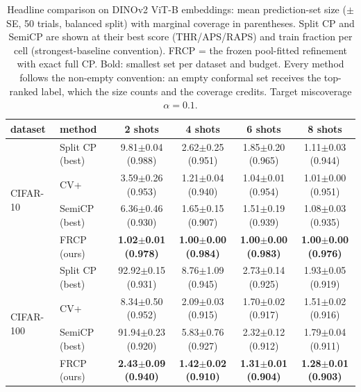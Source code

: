 \begin{table}[t]
\centering
\small
\caption{Headline comparison on DINOv2 ViT-B embeddings: mean prediction-set size ($\pm$ SE, 50 trials, balanced split) with marginal coverage in parentheses. Split CP and SemiCP are shown at their best score (THR/APS/RAPS) and train fraction per cell (strongest-baseline convention). FRCP = the frozen pool-fitted refinement with exact full CP. Bold: smallest set per dataset and budget. Every method follows the non-empty convention: an empty conformal set receives the top-ranked label, which the size counts and the coverage credits. Target miscoverage $\alpha=0.1$.}
\label{tab:headline-main}
\begin{tabular}{llcccc}
\toprule
dataset & method & 2 shots & 4 shots & 6 shots & 8 shots\\
\midrule
\multirow{4}{*}{CIFAR-10} & Split CP (best) & 9.81$\pm$0.04 {\scriptsize(0.988)} & 2.62$\pm$0.25 {\scriptsize(0.951)} & 1.85$\pm$0.20 {\scriptsize(0.965)} & 1.11$\pm$0.03 {\scriptsize(0.944)}\\
 & CV+ & 3.59$\pm$0.26 {\scriptsize(0.953)} & 1.21$\pm$0.04 {\scriptsize(0.940)} & 1.04$\pm$0.01 {\scriptsize(0.954)} & 1.01$\pm$0.00 {\scriptsize(0.951)}\\
 & SemiCP (best) & 6.36$\pm$0.46 {\scriptsize(0.930)} & 1.65$\pm$0.15 {\scriptsize(0.907)} & 1.51$\pm$0.19 {\scriptsize(0.939)} & 1.08$\pm$0.03 {\scriptsize(0.935)}\\
 & FRCP (ours) & \textbf{1.02$\pm$0.01 {\scriptsize(0.978)}} & \textbf{1.00$\pm$0.00 {\scriptsize(0.984)}} & \textbf{1.00$\pm$0.00 {\scriptsize(0.983)}} & \textbf{1.00$\pm$0.00 {\scriptsize(0.976)}}\\
\midrule
\multirow{4}{*}{CIFAR-100} & Split CP (best) & 92.92$\pm$0.15 {\scriptsize(0.931)} & 8.76$\pm$1.09 {\scriptsize(0.945)} & 2.73$\pm$0.14 {\scriptsize(0.925)} & 1.93$\pm$0.05 {\scriptsize(0.919)}\\
 & CV+ & 8.34$\pm$0.50 {\scriptsize(0.952)} & 2.09$\pm$0.03 {\scriptsize(0.915)} & 1.70$\pm$0.02 {\scriptsize(0.917)} & 1.51$\pm$0.02 {\scriptsize(0.916)}\\
 & SemiCP (best) & 91.94$\pm$0.23 {\scriptsize(0.920)} & 5.83$\pm$0.76 {\scriptsize(0.927)} & 2.32$\pm$0.12 {\scriptsize(0.912)} & 1.79$\pm$0.04 {\scriptsize(0.911)}\\
 & FRCP (ours) & \textbf{2.43$\pm$0.09 {\scriptsize(0.940)}} & \textbf{1.42$\pm$0.02 {\scriptsize(0.910)}} & \textbf{1.31$\pm$0.01 {\scriptsize(0.904)}} & \textbf{1.28$\pm$0.01 {\scriptsize(0.903)}}\\

\end{tabular}
\end{table}
